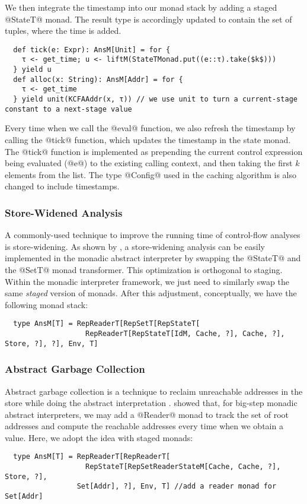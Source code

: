 We then integrate the timestamp into our monad stack by adding a staged
@StateT@ monad. The result type is accordingly updated to contain the set of
tuples, where the time is added.
\begin{lstlisting}
  def tick(e: Expr): AnsM[Unit] = for {
    τ <- get_time; u <- liftM(StateTMonad.put((e::τ).take($k$)))
  } yield u
  def alloc(x: String): AnsM[Addr] = for {
    τ <- get_time
  } yield unit(KCFAAddr(x, τ)) // we use unit to turn a current-stage constant to a next-stage value
\end{lstlisting}

Every time when we call the @eval@ function, we also refresh the timestamp by
calling the @tick@ function, which updates the timestamp in the state monad.
The @tick@ function is implemented as prepending the current control expression
being evaluated (@e@) to the existing calling context, and then taking the
first $k$ elements from the list. The type @Config@ used in the caching
algorithm is also changed to include timestamps.

\subsubsection{Store-Widened Analysis}

A commonly-used technique to improve the running time of control-flow analyses
is store-widening. As shown by \cite{Darais:2015:GTM:2814270.2814308,
DBLP:journals/pacmpl/DaraisLNH17}, a store-widening analysis can be easily
implemented in the monadic abstract interpreter by swapping the @StateT@ and
the @SetT@ monad transformer. This optimization is orthogonal to staging.
Within the monadic interpreter framework, we just need to similarly swap the
same \textit{staged} version of monads. After this adjustment, conceptually, we
have the following monad stack:
\begin{lstlisting}
  type AnsM[T] = RepReaderT[RepSetT[RepStateT[
                   RepReaderT[RepStateT[IdM, Cache, ?], Cache, ?], Store, ?], ?], Env, T]
\end{lstlisting}

\subsubsection{Abstract Garbage Collection}

Abstract garbage collection is a technique to reclaim unreachable addresses in
the store while doing the abstract interpretation
\cite{Might:2006:IFA:1159803.1159807}. \citet{DBLP:journals/pacmpl/DaraisLNH17}
showed that, for big-step monadic abstract interpreters, we may add a @Reader@
monad to track the set of root addresses and compute the reachable addresses every
time when we obtain a value. Here, we adopt the idea with staged monads:
\begin{lstlisting}
  type AnsM[T] = RepReaderT[RepReaderT[
                   RepStateT[RepSetReaderStateM[Cache, Cache, ?], Store, ?],
                 Set[Addr], ?], Env, T] //add a reader monad for Set[Addr]
\end{lstlisting}

